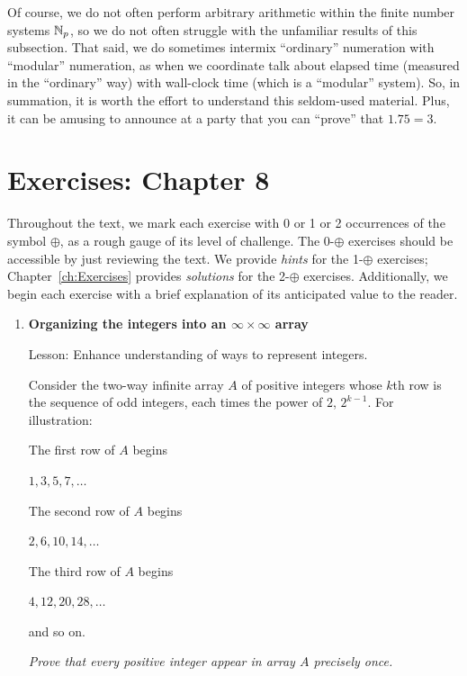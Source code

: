 \medskip

Of course, we do not often perform arbitrary arithmetic within the finite number systems $\mathbb{N}_p$, so we do not often struggle with the unfamiliar results of this subsection.  
That said, we do sometimes
intermix ``ordinary'' numeration with ``modular'' numeration, as when we coordinate talk about elapsed time (measured in the ``ordinary'' way) 
with wall-clock time (which is a ``modular'' system).  
So, in summation, it is worth the effort to understand this seldom-used material.  Plus, it can be amusing to announce at a party that you can ``prove'' that $1.75 = 3$.




\section{Exercises: Chapter 8}

Throughout the text, we mark each exercise with 0 or 1 or 2
occurrences of the symbol $\oplus$, as a rough gauge of its level of
challenge.  The 0-$\oplus$ exercises should be accessible by just
reviewing the text.  We provide {\em hints} for the 1-$\oplus$
exercises; Chapter~\ref{ch:Exercises} provides {\em solutions} for the
2-$\oplus$ exercises.  Additionally, we begin each exercise with a
brief explanation of its anticipated value to the reader.
 

\begin{enumerate}
\item
{\bf Organizing the integers into an $\infty \times \infty$ array}

{\sc Lesson:} Enhance understanding of ways to represent integers.

\smallskip

Consider the two-way infinite array $A$ of positive integers whose $k$th row is the sequence of odd integers, each times the power of $2$, $2^{k-1}$.  For illustration:

The first row of $A$ begins

\hspace*{.2in}$1, 3, 5, 7, \ldots$

The second row of $A$ begins

\hspace*{.2in}$2, 6, 10, 14, \ldots$

The third row of $A$ begins

\hspace*{.2in}$4, 12, 20, 28, \ldots$

and so on.

\smallskip

{\em Prove that every positive integer appear in array $A$ precisely once.}


\end{enumerate}



